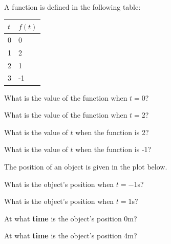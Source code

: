 \begin{problem}
\item A function is defined in the following table:

  \begin{tabular}{l|l}
    $t$ & $f(t)$ \\ \hline
    0 & 0 \\
    1 & 2 \\
    2 & 1 \\
    3 & -1
  \end{tabular}

  \begin{subproblem}
  \item What is the value of the function when $t=0$?
    \vfill
  \item What is the value of the function when $t=2$?
    \vfill
  \item What is the value of $t$ when the function is 2?
    \vfill
  \item What is the value of $t$ when the function is -1?
    \vfill
  \end{subproblem}

\clearpage

\item The position of an object is given in the plot below.

  \scalebox{0.55}{}

  \begin{subproblem}
    \item What is the object's position when $t=-1$s?
      \vfill

    \item What is the object's position when $t=1$s?
      \vfill

    \item At what \textbf{time} is the object's position 0m?
      \vfill

    \item At what \textbf{time} is the object's position 4m?
      \vfill

  \end{subproblem}



\end{problem}


